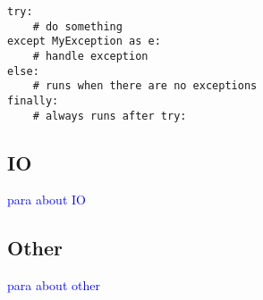 \begin{lstlisting}[style=pyInStyle]
try:
    # do something
except MyException as e:
    # handle exception
else:
    # runs when there are no exceptions
finally:
    # always runs after try:
\end{lstlisting}

\subsection{IO}

\textcolor{blue}{para about IO}

\subsection{Other}

\textcolor{blue}{para about other}


